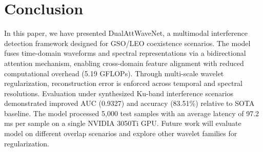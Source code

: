\documentclass[conference]{IEEEtran}
\begin{document}


\section{Conclusion}

In this paper, we have presented DualAttWaveNet, a multimodal interference detection framework designed for GSO/LEO coexistence scenarios. The model fuses time-domain waveforms and spectral representations via a bidirectional attention mechanism, enabling cross-domain feature alignment with reduced computational overhead (5.19 GFLOPs). Through multi-scale wavelet regularization, reconstruction error is enforced across temporal and spectral resolutions. Evaluation under synthesized Ku-band interference scenarios demonstrated improved AUC (0.9327) and accuracy (83.51\%) relative to SOTA baseline. The model processed 5,000 test samples with an average latency of 97.2 ms per sample on a single NVIDIA 3050Ti GPU. Future work will evaluate model on different overlap scenarios and explore other wavelet families for regularization.



\end{document}
